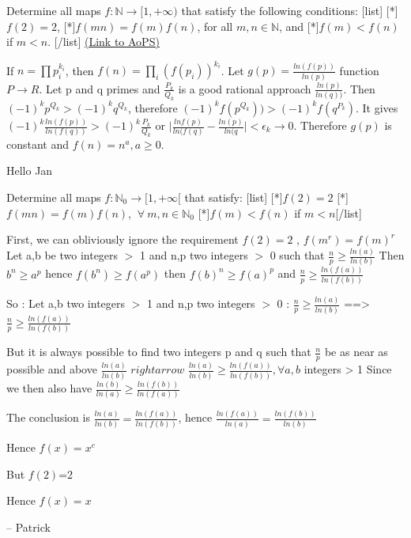\begin{problem}
	Determine all maps $f: \mathbb{N}\rightarrow [1,+\infty)$ that satisfy the following conditions:
[list]
[*]$f(2)=2$,
[*]$f(mn)=f(m)f(n)$, for all $m,n \in \mathbb{N}$, and
[*]$f(m) < f(n)$ if $m < n$.
[/list]
	\flushright \href{https://artofproblemsolving.com/community/c6h146348}{(Link to AoPS)}
\end{problem}



\begin{mysolution}
	If $n=\prod p_{i}^{k_{i}}$, then $f(n)=\prod_{i}(f(p_{i}))^{k_{i}}$.
Let $g(p)=\frac{ln(f(p))}{ln(p)}$ function $P\to R$.
Let p and q primes and $\frac{P_{k}}{Q_{k}}$ is a good rational approach $\frac{ln(p)}{ln(q))}$.
Then $(-1)^{k}p^{Q_{k}}>(-1)^{k}q^{Q_{k}}$, therefore $(-1)^{k}f(p^{Q_{k}}))>(-1)^{k}f(q^{P_{k}})$.
It gives $(-1)^{k}\frac{ln(f(p))}{ln(f(q))}>(-1)^{k}\frac{P_{k}}{Q_{k}}$ or ${|\frac{lnf(p)}{ln(f(q)}-\frac{ln(p)}{ln(q}}|<\epsilon_{k}\to 0$.
Therefore $g(p)$ is constant and $f(n)=n^{a},a\ge 0$.
\end{mysolution}



\begin{mysolution}
	Hello Jan

\begin{tcolorbox}Determine all maps $f: \mathbb{N}_{0}\rightarrow [1,+\infty[$ that satisfy:
[list]
[*]$f(2)=2$
[*]$f(mn)=f(m)f(n)$, $\ \forall \ m,n \in \mathbb{N}_{0}$
[*]$f(m) < f(n)$ if $m < n$[/list]\end{tcolorbox}

First, we can obliviously ignore the requirement $f(2)=2$
, $f(m^{r})=f(m)^{r}$
Let a,b be two integers $>$ 1 and n,p two integers $>$ 0 such that $\frac{n}{p}\geq\frac{ln(a)}{ln(b)}$
Then $b^{n}\geq a^{p}$ hence $f(b^{n})\geq f(a^{p})$ then $f(b)^{n}\geq f(a)^{p}$ and $\frac{n}{p}\geq\frac{ln(f(a))}{ln(f(b))}$

So : Let a,b two integers $>$ 1 and n,p two integers $>$ 0 : $\frac{n}{p}\geq\frac{ln(a)}{ln(b)}$ ==> $\frac{n}{p}\geq\frac{ln(f(a))}{ln(f(b))}$

But it is always possible to find two integers p and q such that $\frac{n}{p}$ be as near as possible and above $\frac{ln(a)}{ln(b)}$
$rightarrow$ $\frac{ln(a)}{ln(b)}\geq\frac{ln(f(a))}{ln(f(b))}, \forall a,b$ integers > 1
Since we then also have $\frac{ln(b)}{ln(a)}\geq\frac{ln(f(b))}{ln(f(a))}$

The conclusion is $\frac{ln(a)}{ln(b)}=\frac{ln(f(a))}{ln(f(b))}$, hence $\frac{ln(f(a))}{ln(a)}=\frac{ln(f(b))}{ln(b)}$

Hence $f(x)=x^{c}$

But $f(2)$=2

Hence $f(x) = x$

-- 
Patrick
\end{mysolution}



